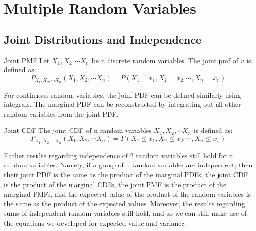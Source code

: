 \section{Multiple Random Variables}
\subsection{Joint Distributions and Independence}
\begin{defn}{Joint PMF}{}
Let \(X_1, X_2, \cdots X_n\) be n discrete random variables. The joint pmf of \(v\) is defined as:
\begin{equation*}
  P_{X_1, X_2, \cdots X_n}(X_1, X_2, \cdots X_n) = P(X_1 = x_1, X_2 = x_2, \cdots, X_n = x_n)
\end{equation*}

\end{defn}
For continuous random variables, the joinf PDF can be defined similarly using integrals. The marginal PDF can be reconstructed by integrating out all other random variables from the joint PDF.
\begin{defn}{Joint CDF}{}
The joint CDF of n random variables \(X_1, X_2, \cdots X_n\) is defined as: 
\begin{equation*}
  F_{X_1, X_2, \cdots X_n}(X_1, X_2, \cdots X_n) = F(X_1 \leq x_1, X_2 \leq x_2, \cdots, X_n \leq x_n)
\end{equation*}
\end{defn}
Earlier results regarding independence of 2 random variables still hold for n random variables. Namely, if a group of n random variables are independent, then their joint PDF is the same as the product of the marginal PDFs, the joint CDF is the product of the marginal CDFs, the joint PMF is the product of the marginal PMFs, and the expected value of the product of the random variables is the same as the product of the expected values. Moreover, the results regarding sums of independent random variables still hold, and so we can still make use of the equations we developed for expected value and variance.
